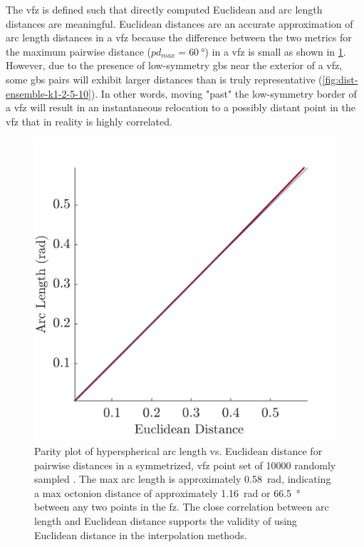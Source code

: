\documentclass[preprint,12pt]{elsarticle}
\begin{document}
The \gls{vfz} is defined such that directly computed Euclidean and arc length distances are meaningful. Euclidean distances are an accurate approximation of arc length distances in a \gls{vfz} because the difference between the two metrics for the maximum pairwise distance ($pd_{max} = \SI{60}{\degree}$) in a \gls{vfz} is small as shown in \cref{fig:dist-parity}. However, due to the presence of low-symmetry \glspl{gb} near the exterior of a \gls{vfz}, some \glspl{gb} pairs will exhibit larger distances than is truly representative (\cref{fig:dist-ensemble-k1-2-5-10}). In other words, moving "past" the low-symmetry border of a \gls{vfz} will result in an instantaneous relocation to a possibly distant point in the \gls{vfz} that in reality is highly correlated.

\begin{figure}
\centering
\includegraphics[scale=1]{dist-parity.png}
\caption{Parity plot of hyperspherical arc length vs. Euclidean distance for pairwise distances in a symmetrized, \gls{vfz} point set of \num{10000} randomly sampled . The max arc length is approximately \SI{0.58}{\radian}, indicating a max octonion distance of approximately \SI{1.16}{\radian} or \SI{66.5}{\degree} between any two points in the \acrlong{fz}. The close correlation between arc length and Euclidean distance supports the validity of using Euclidean distance in the interpolation methods.}
\label{fig:dist-parity}
\end{figure}
\end{document}
